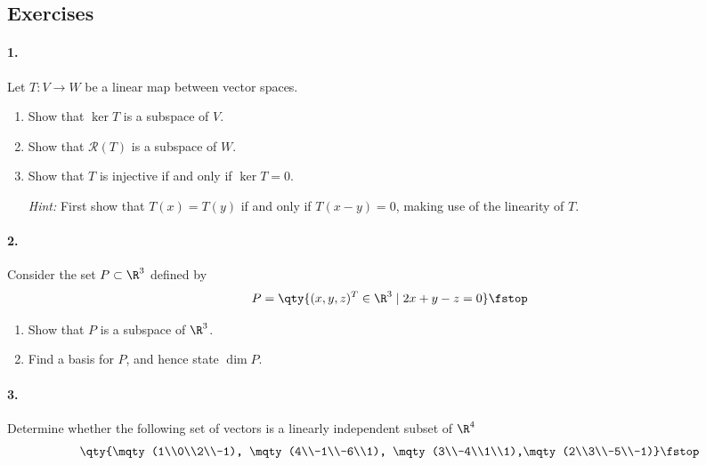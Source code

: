 \subsection*{Exercises}
\paragraph{1.} Let \( T:V\to W \) be a linear map between vector spaces.
\begin{enumerate}[label=(\alph*)]
\item Show that \( \ker T \) is a subspace of \( V \).
\item Show that \( \mathcal{R}(T) \) is a subspace of \( W \).
  \item Show that \( T \) is injective if and only if \( \ker T=\qty{0} \).

  \vspace{1mm}

  \emph{Hint:} First show that \( T(x)=T(y) \) if and only if \( T(x-y)=0 \), making use of the linearity of \( T \).
\end{enumerate}

\paragraph{2.} Consider the set \( P\subset\R^3 \) defined by
\[ P=\qty{(x,y,z)^T\in\R^3\mid 2x+y-z=0}\fstop \]
\begin{enumerate}[label=(\alph*)]
\item Show that \( P \) is a subspace of \( \R^3 \).
\item Find a basis for \( P \), and hence state \( \dim P \).
\end{enumerate}

\paragraph{3.} Determine whether the following set of vectors is a linearly independent subset of \( \R^4 \)
\[ \qty{\mqty(1\\0\\2\\-1), \mqty(4\\-1\\-6\\1), \mqty(3\\-4\\1\\1),\mqty(2\\3\\-5\\-1)}\fstop \]

